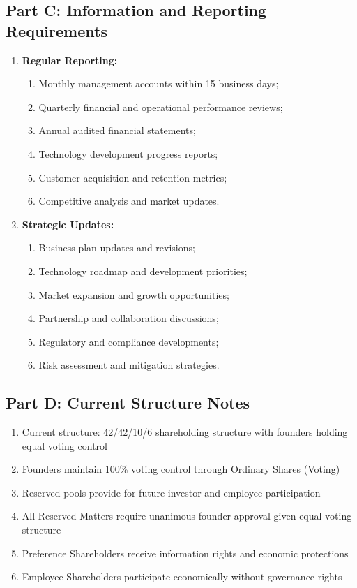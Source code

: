 \subsection*{Part C: Information and Reporting Requirements}

\begin{enumerate}[label=\arabic*.]
    \item \textbf{Regular Reporting:}
        \begin{enumerate}[label=(\alph*)]
            \item Monthly management accounts within 15 business days;
            \item Quarterly financial and operational performance reviews;
            \item Annual audited financial statements;
            \item Technology development progress reports;
            \item Customer acquisition and retention metrics;
            \item Competitive analysis and market updates.
        \end{enumerate}

    \item \textbf{Strategic Updates:}
        \begin{enumerate}[label=(\alph*)]
            \item Business plan updates and revisions;
            \item Technology roadmap and development priorities;
            \item Market expansion and growth opportunities;
            \item Partnership and collaboration discussions;
            \item Regulatory and compliance developments;
            \item Risk assessment and mitigation strategies.
        \end{enumerate}
\end{enumerate}

\subsection*{Part D: Current Structure Notes}

\begin{enumerate}[label=\arabic*.]
    \item Current structure: 42/42/10/6 shareholding structure with founders holding equal voting control
    \item Founders maintain 100\% voting control through Ordinary Shares (Voting)
    \item Reserved pools provide for future investor and employee participation
    \item All Reserved Matters require unanimous founder approval given equal voting structure
    \item Preference Shareholders receive information rights and economic protections
    \item Employee Shareholders participate economically without governance rights
\end{enumerate}

